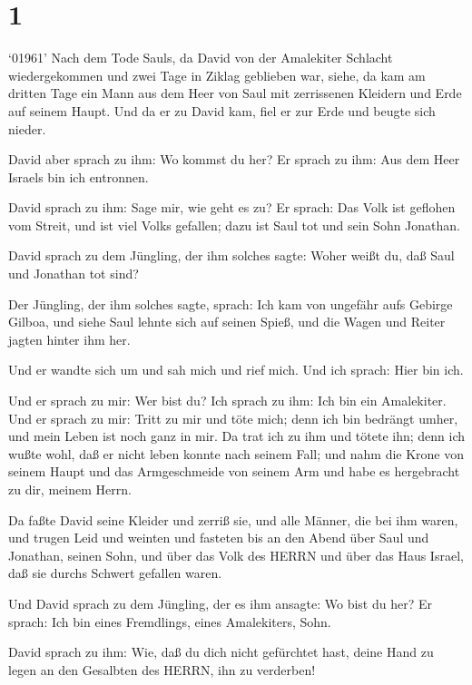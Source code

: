 \hypertarget{section}{%
\section{1}\label{section}}

 `01961' Nach dem Tode Sauls, da David von der Amalekiter
Schlacht wiedergekommen und zwei Tage in Ziklag geblieben war,
 siehe, da kam am dritten Tage ein Mann aus dem Heer von
Saul mit zerrissenen Kleidern und Erde auf seinem Haupt. Und da er zu
David kam, fiel er zur Erde und beugte sich nieder.

 David aber sprach zu ihm: Wo kommst du her? Er sprach zu
ihm: Aus dem Heer Israels bin ich entronnen.

 David sprach zu ihm: Sage mir, wie geht es zu? Er sprach:
Das Volk ist geflohen vom Streit, und ist viel Volks gefallen; dazu ist
Saul tot und sein Sohn Jonathan.

 David sprach zu dem Jüngling, der ihm solches sagte: Woher
weißt du, daß Saul und Jonathan tot sind?

 Der Jüngling, der ihm solches sagte, sprach: Ich kam von
ungefähr aufs Gebirge Gilboa, und siehe Saul lehnte sich auf seinen
Spieß, und die Wagen und Reiter jagten hinter ihm her.

 Und er wandte sich um und sah mich und rief mich. Und ich
sprach: Hier bin ich.

 Und er sprach zu mir: Wer bist du? Ich sprach zu ihm: Ich
bin ein Amalekiter.  Und er sprach zu mir: Tritt zu mir und
töte mich; denn ich bin bedrängt umher, und mein Leben ist noch ganz in
mir.  Da trat ich zu ihm und tötete ihn; denn ich wußte
wohl, daß er nicht leben konnte nach seinem Fall; und nahm die Krone von
seinem Haupt und das Armgeschmeide von seinem Arm und habe es
hergebracht zu dir, meinem Herrn.

 Da faßte David seine Kleider und zerriß sie, und alle
Männer, die bei ihm waren,  und trugen Leid und weinten und
fasteten bis an den Abend über Saul und Jonathan, seinen Sohn, und über
das Volk des HERRN und über das Haus Israel, daß sie durchs Schwert
gefallen waren.

 Und David sprach zu dem Jüngling, der es ihm ansagte: Wo
bist du her? Er sprach: Ich bin eines Fremdlings, eines Amalekiters,
Sohn.

 David sprach zu ihm: Wie, daß du dich nicht gefürchtet
hast, deine Hand zu legen an den Gesalbten des HERRN, ihn zu verderben!

